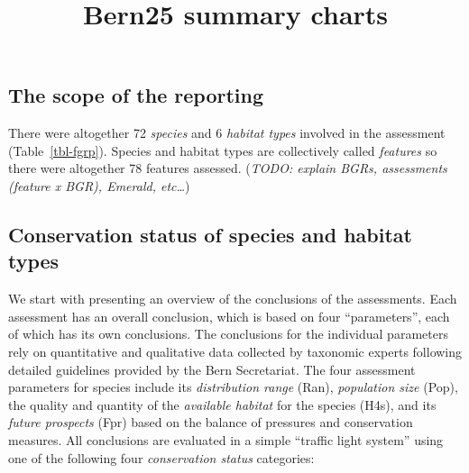 \documentclass[
  letterpaper,
  DIV=11,
  numbers=noendperiod]{scrartcl}
\title{Bern25 summary charts}
\author{}
\date{}
\begin{document}
\maketitle

\subsection{The scope of the
reporting}\label{the-scope-of-the-reporting}

There were altogether 72 \emph{species} and 6 \emph{habitat types}
involved in the assessment (Table~\ref{tbl-fgrp}). Species and habitat
types are collectively called \emph{features} so there were altogether
78 features assessed. (\emph{TODO: explain BGRs, assessments (feature x
BGR), Emerald, etc\ldots{}})

\begin{table}

\caption{\label{tbl-fgrp}}


\end{table}%

\subsection{Conservation status of species and habitat
types}\label{conservation-status-of-species-and-habitat-types}

We start with presenting an overview of the conclusions of the
assessments. Each assessment has an overall conclusion, which is based
on four ``parameters'', each of which has its own conclusions. The
conclusions for the individual parameters rely on quantitative and
qualitative data collected by taxonomic experts following detailed
guidelines provided by the Bern Secretariat. The four assessment
parameters for species include its \emph{distribution range} (Ran),
\emph{population size} (Pop), the quality and quantity of the
\emph{available habitat} for the species (H4s), and its \emph{future
prospects} (Fpr) based on the balance of pressures and conservation
measures. All conclusions are evaluated in a simple ``traffic light
system'' using one of the following four \emph{conservation status}
categories:
\end{document}
